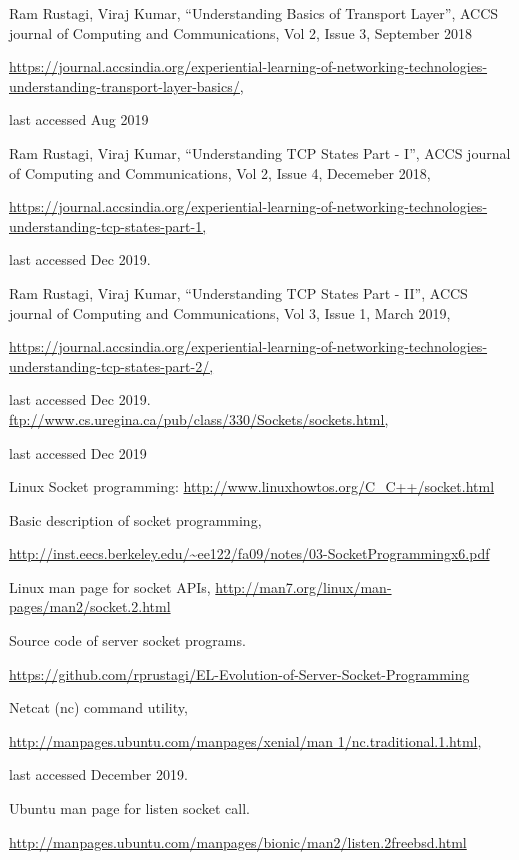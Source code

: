 \begin{multicols}{2}
\begin{thebibliography}{99}
 Ram Rustagi, Viraj Kumar, “Understanding Basics of Transport Layer”, ACCS journal of Computing and Communications, Vol 2, Issue 3, September 2018

\url{https://journal.accsindia.org/experiential-learning-of-networking-technologies-understanding-transport-layer-basics/,}

last accessed Aug 2019

 Ram Rustagi, Viraj Kumar, “Understanding TCP States Part - I”, ACCS journal of Computing and Communications, Vol 2, Issue 4, Decemeber 2018,

\url{https://journal.accsindia.org/experiential-learning-of-networking-technologies-understanding-tcp-states-part-1,}

last accessed Dec 2019.

 Ram Rustagi, Viraj Kumar, “Understanding TCP States Part - II”, ACCS journal of Computing and Communications, Vol 3, Issue 1, March 2019,

\url{https://journal.accsindia.org/experiential-learning-of-networking-technologies-understanding-tcp-states-part-2/,}

last accessed Dec 2019.
 \url{ftp://www.cs.uregina.ca/pub/class/330/Sockets/sockets.html,}

 last accessed Dec 2019

 Linux Socket programming: \url{http://www.linuxhowtos.org/C_C++/socket.html}

 Basic description of socket programming,

\url{http://inst.eecs.berkeley.edu/~ee122/fa09/notes/03-SocketProgrammingx6.pdf}

 Linux man page for socket APIs, \url{http://man7.org/linux/man-pages/man2/socket.2.html}

 Source code of server socket programs.

\url{https://github.com/rprustagi/EL-Evolution-of-Server-Socket-Programming}

 Netcat (nc) command utility,

\url{http://manpages.ubuntu.com/manpages/xenial/man 1/nc.traditional.1.html},

last accessed December 2019. 

 Ubuntu man page for listen socket call.

\url{http://manpages.ubuntu.com/manpages/bionic/man2/listen.2freebsd.html}


\end{thebibliography}
\end{multicols}

